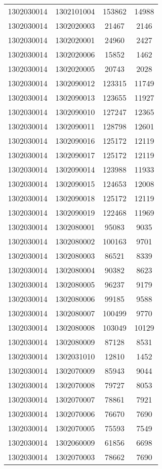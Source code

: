 \begin{longtable}{llcc}
1302030014 & 1302101004 & 153862 & 14988\\
1302030014 & 1302020003 & 21467 & 2146\\
1302030014 & 1302020001 & 24960 & 2427\\
1302030014 & 1302020006 & 15852 & 1462\\
1302030014 & 1302020005 & 20743 & 2028\\
1302030014 & 1302090012 & 123315 & 11749\\
1302030014 & 1302090013 & 123655 & 11927\\
1302030014 & 1302090010 & 127247 & 12365\\
1302030014 & 1302090011 & 128798 & 12601\\
1302030014 & 1302090016 & 125172 & 12119\\
1302030014 & 1302090017 & 125172 & 12119\\
1302030014 & 1302090014 & 123988 & 11933\\
1302030014 & 1302090015 & 124653 & 12008\\
1302030014 & 1302090018 & 125172 & 12119\\
1302030014 & 1302090019 & 122468 & 11969\\
1302030014 & 1302080001 & 95083 & 9035\\
1302030014 & 1302080002 & 100163 & 9701\\
1302030014 & 1302080003 & 86521 & 8339\\
1302030014 & 1302080004 & 90382 & 8623\\
1302030014 & 1302080005 & 96237 & 9179\\
1302030014 & 1302080006 & 99185 & 9588\\
1302030014 & 1302080007 & 100499 & 9770\\
1302030014 & 1302080008 & 103049 & 10129\\
1302030014 & 1302080009 & 87128 & 8531\\
1302030014 & 1302031010 & 12810 & 1452\\
1302030014 & 1302070009 & 85943 & 9044\\
1302030014 & 1302070008 & 79727 & 8053\\
1302030014 & 1302070007 & 78861 & 7921\\
1302030014 & 1302070006 & 76670 & 7690\\
1302030014 & 1302070005 & 75593 & 7549\\
1302030014 & 1302060009 & 61856 & 6698\\
1302030014 & 1302070003 & 78662 & 7690\\

\end{longtable}
